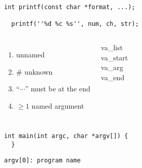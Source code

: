 \begin{frame}[fragile]{}
  \centerline{\large {}}

  \vspace{0.30cm}
      \begin{lstlisting}[style = Cstyle]
  int printf(const char *format, ...);

  printf(''%d %c %s'', num, ch, str);
      \end{lstlisting}

  \vspace{0.30cm}
  \begin{columns}
      \begin{enumerate}[(1)]
        \item unnamed
        \item \# unknown
        \pause
	\vspace{0.60cm}
        \item ``$\cdots$'' must be at the end
        \item $\ge 1$ named argument
      \end{enumerate}
    \pause
      \begin{center}
	{\large
	  va\_list  \\[0.5cm]

	  va\_start \\[0.10cm]
	  va\_arg \\[0.10cm]
	  va\_end
	}
      \end{center}
  \end{columns}

  \pause
  \vspace{0.30cm}
  \centerline{\large {}}
\end{frame}

\begin{frame}[fragile]{}
  \centerline{\large {}}

  \vspace{0.30cm}
  \begin{lstlisting}[style = Cstyle]
  int main(int argc, char *argv[]) {
  }
  \end{lstlisting}

  \vspace{0.30cm}
  \centerline{\texttt{argv[0]: program name}}

  \pause
  \vspace{0.30cm}
  \centerline{\large {}}

  \pause
  \vspace{0.60cm}
  \centerline{\large {}}
\end{frame}

